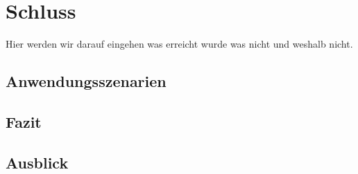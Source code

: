 \section{Schluss}
Hier werden wir darauf eingehen was erreicht wurde was nicht und weshalb nicht.
\subsection{Anwendungsszenarien}
\subsection{Fazit}
\subsection{Ausblick}